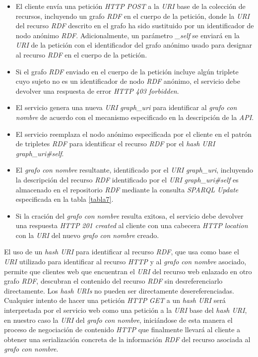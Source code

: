 \begin{itemize}

\item El cliente env\'ia una petici\'on \textit{HTTP} \textit{POST} a la \textit{URI} base de la colecci\'on de recursos, incluyendo un grafo \textit{RDF} en el cuerpo de la petici\'on, donde la \textit{URI} del recurso \textit{RDF} descrito en el grafo ha sido sustituido por un identificador de nodo an\'onimo \textit{RDF}. Adicionalmente, un par\'ametro \textit{\_self} se enviar\'a en la \textit{URI} de la petici\'on con el identificador del grafo an\'onimo usado para designar al recurso \textit{RDF} en el cuerpo de la petici\'on.
\item Si el grafo \textit{RDF} enviado en el cuerpo de la petici\'on incluye alg\'un triplete cuyo sujeto no es un identificador de nodo \textit{RDF} an\'onimo, el servicio debe devolver una respuesta de error \textit{HTTP} \textit{403 forbidden}.
\item El servicio genera una nueva \textit{URI} \textit{graph\_uri} para identificar al \textit{grafo con nombre} de acuerdo con el mecanismo especificado en la descripci\'on de la \textit{API}.
\item El servicio reemplaza el nodo an\'onimo especificada por el cliente en el patr\'on de tripletes \textit{RDF} para identificar el recurso \textit{RDF} por el \textit{hash URI} \cite{fielding2005httprange} \textit{graph\_uri\#self}.
\item El \textit{grafo con nombre} resultante, identificado por el \textit{URI} \textit{graph\_uri}, incluyendo la descripci\'on del recurso \textit{RDF} identificado por el \textit{URI} \textit{graph\_uri\#self} es almacenado en el repositorio \textit{RDF} mediante la consulta \textit{SPARQL Update} especificada en la tabla \ref{tabla7}.
\item Si la craci\'on del \textit{grafo con nombre}  resulta exitosa, el servicio debe devolver una respuesta \textit{HTTP} \textit{201 created} al cliente con una cabecera \textit{HTTP} \textit{location} con la \textit{URI} del nuevo \textit{grafo con nombre} creado.

\end{itemize}

El uso de un \textit{hash URI} para identificar al recurso \textit{RDF}, que usa como base el \textit{URI} utilizado para identificar al recurso \textit{HTTP} y al \textit{grafo con nombre} asociado, permite que clientes web que encuentran el \textit{URI} del recurso web enlazado en otro grafo \textit{RDF}, descubran el contenido del recurso \textit{RDF} sin desreferenciarlo directamente. Los \textit{hash URIs} no pueden ser directamente desereferenciadas. Cualquier intento de hacer una petici\'on \textit{HTTP} \textit{GET} a un \textit{hash URI} ser\'a interpretada por el servicio web como una petici\'on a la \textit{URI} base del \textit{hash URI}, en nuestro caso la \textit{URI} del \textit{grafo con nombre}, inici\'andose de esta manera el proceso de negociaci\'on de contenido \textit{HTTP} que finalmente llevar\'a al cliente a obtener una serializaci\'on concreta de la informaci\'on \textit{RDF} del recurso asociada al \textit{grafo con nombre}.

